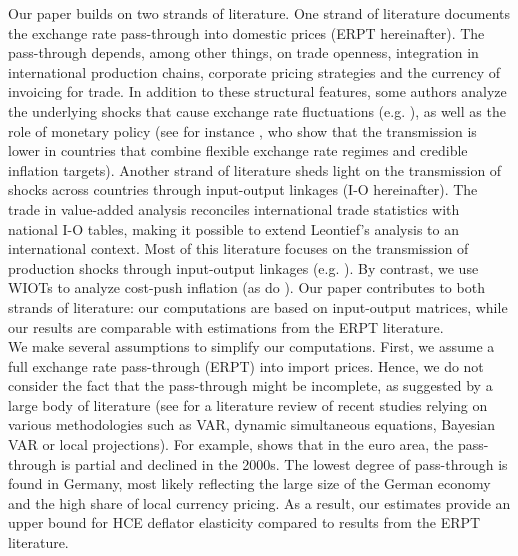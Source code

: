 \documentclass[11pt,a4paper]{paper} %
\begin{document}
Our paper builds on two strands of literature. 
One strand of literature documents the exchange rate pass-through into domestic prices (ERPT hereinafter). 
The pass-through depends, among other things, on trade openness, integration in international production chains, corporate pricing strategies and the currency of invoicing for trade.
In addition to these structural features, some authors analyze the underlying shocks that cause exchange rate fluctuations (e.g. \cite{Forbes2018}), as well as the role of monetary policy (see for instance \cite{Ha2020}, who show that the transmission is lower in countries that combine flexible exchange rate regimes and credible inflation targets). 
Another strand of literature sheds light on the transmission of shocks across countries through input-output linkages (I-O hereinafter).
The trade in value-added analysis reconciles international trade statistics with national I-O tables, making it possible to extend Leontief's analysis \citep{Leontief1951} to an international context.
Most of this literature focuses on the transmission of production shocks through input-output linkages (e.g. \cite{Johnson2014, Eaton2016}).
By contrast, we use WIOTs to analyze cost-push inflation (as do \cite{Aydogus2018}).
Our paper contributes to both strands of literature: our computations are based on input-output matrices, while our results are comparable with estimations from the ERPT literature. \\
We make several assumptions to simplify our computations. 
First, we assume a full exchange rate pass-through (ERPT) into import prices. 
Hence, we do not consider the fact that the pass-through might be incomplete, as suggested by a large body of literature (see \cite{Ortega2020} for a literature review of recent studies relying on various methodologies such as VAR, dynamic simultaneous equations, Bayesian VAR or local projections). 
For example, \cite{Ozyurt2016} shows that in the euro area, the pass-through is partial and declined in the 2000s. The lowest degree of pass-through is found in Germany, most likely reflecting the large size of the German economy and the high share of local currency pricing. 
As a result, our estimates provide an upper bound for HCE deflator elasticity compared to results from the ERPT literature. 
\end{document}
